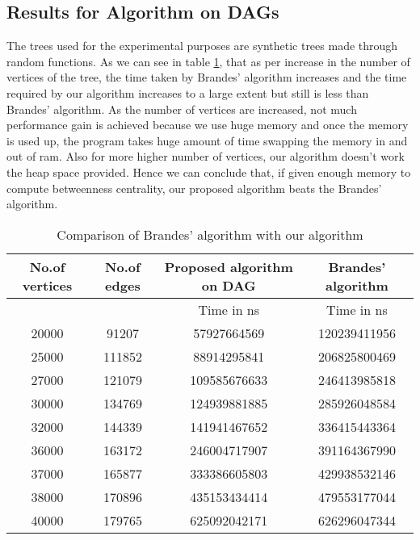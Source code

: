 \subsection{Results for Algorithm on DAGs}
The trees used for the experimental purposes are synthetic trees made through random functions.
As we can see in table \ref{tab:res1}, that as per increase in the number of vertices of the tree, the time taken by Brandes' algorithm increases and the time required by our algorithm increases to a large extent but still is less than Brandes' algorithm. As the number of vertices are increased, not much performance gain is achieved because we use huge memory and once the memory is used up, the program takes huge amount of time swapping the memory in and out of ram. Also for more higher number of vertices, our algorithm doesn't work the heap space provided.
Hence we can conclude that, if given enough memory to compute betweenness centrality, our proposed algorithm beats the Brandes' algorithm.


\begin{table}[h!]
\centering
\begin{tabular}{|c|c|c|c|}
\hline
No.of vertices & No.of edges & Proposed algorithm on DAG & Brandes' algorithm \\
\hline
 & & Time in ns & Time in ns\\ 
\hline
20000 & 91207 & 57927664569 & 120239411956 \\ 
\hline
25000 & 111852 & 88914295841 & 206825800469 \\ 
\hline
27000 & 121079 & 109585676633 & 246413985818 \\ 
\hline
30000 & 134769 & 124939881885 & 285926048584 \\ 
\hline
32000 & 144339 & 141941467652 & 336415443364 \\ 
\hline
36000 & 163172 & 246004717907 & 391164367990 \\ 
\hline
37000 & 165877 & 333386605803 & 429938532146 \\ 
\hline
38000 & 170896 & 435153434414 & 479553177044 \\ 
\hline
40000 & 179765 & 625092042171 & 626296047344 \\ 
\hline
\end{tabular}
\caption{Comparison of Brandes' algorithm with our algorithm}
\label{tab:res1}
\end{table}